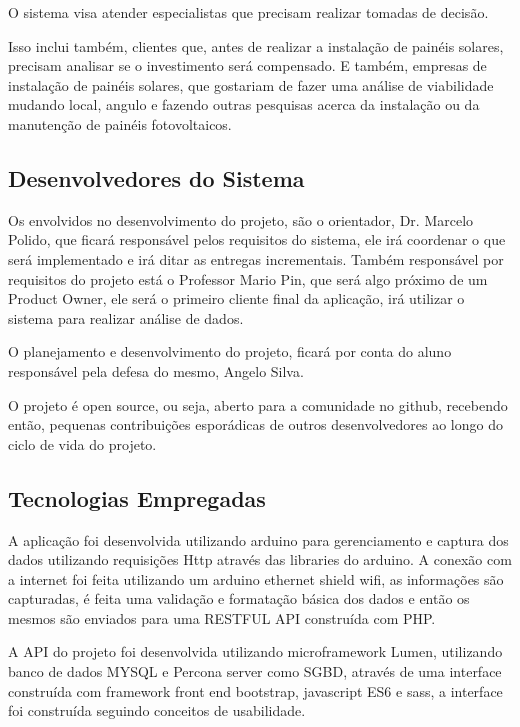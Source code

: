 O sistema visa atender especialistas que precisam realizar tomadas de decisão.

Isso inclui também, clientes que, antes de realizar a instalação de painéis solares, precisam analisar se o investimento será compensado. E também, empresas de instalação de painéis solares, que gostariam de fazer uma análise de viabilidade mudando local, angulo e fazendo outras pesquisas acerca da instalação ou da manutenção de painéis fotovoltaicos.

\subsection{Desenvolvedores do Sistema}

Os envolvidos no desenvolvimento do projeto, são o orientador, Dr. Marcelo Polido, que ficará responsável pelos requisitos do sistema, ele irá coordenar o que será implementado e irá ditar as entregas incrementais. Também responsável por requisitos do projeto está o Professor Mario Pin, que será algo próximo de um Product Owner, ele será o primeiro cliente final da aplicação, irá utilizar o sistema para realizar análise de dados.

O planejamento e desenvolvimento do projeto, ficará por conta do aluno responsável pela defesa do mesmo, Angelo Silva.

O projeto é open source, ou seja, aberto para a comunidade no github, recebendo então, pequenas contribuições esporádicas de outros desenvolvedores ao longo do ciclo de vida do projeto.

\subsection{Tecnologias Empregadas}

A aplicação foi desenvolvida utilizando arduino para gerenciamento e captura dos dados utilizando requisições Http através das libraries do arduino. A conexão com a internet foi feita utilizando um arduino ethernet shield wifi, as informações são capturadas, é feita uma validação e formatação básica dos dados e então os mesmos são enviados para uma RESTFUL API construída com PHP.

A API do projeto foi desenvolvida utilizando microframework Lumen, utilizando banco de dados MYSQL e Percona server como SGBD, através de uma interface construída com framework front end bootstrap, javascript ES6 e sass, a interface foi construída seguindo conceitos de usabilidade.


